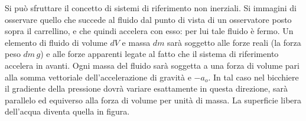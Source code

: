 \documentclass[10pt,a4paper]{book}
\begin{document}
\begin{figure}[htpb]
\end{figure}
\FloatBarrier
Si può sfruttare il concetto di sistemi di riferimento non inerziali. Si immagini di osservare quello che succede al fluido dal punto di vista di un osservatore posto sopra il carrellino, e che quindi accelera con esso: per lui tale fluido è fermo. Un elemento di fluido di volume $dV$ e massa $dm$ sarà soggetto alle forze reali (la forza peso $dm\,g$) e alle forze apparenti legate al fatto che il sistema di riferimento accelera in avanti. Ogni massa del fluido sarà soggetta a una forza di volume pari alla somma vettoriale dell'accelerazione di gravità e $-a_o$. In tal caso nel bicchiere il gradiente della pressione dovrà variare esattamente in questa direzione, sarà parallelo ed equiverso alla forza di volume per unità di massa. La superficie libera dell'acqua diventa quella in figura.
\end{document}
